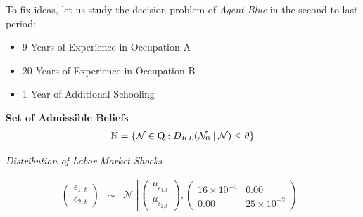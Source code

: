 \begin{frame}
To fix ideas, let us study the decision problem of \textit{Agent Blue} in the second to last period:

\begin{itemize}\setlength\itemsep{1em}
\item 9 Years of Experience in Occupation A
\item 20 Years of  Experience in Occupation B
\item 1 Year of Additional Schooling
\end{itemize}
\end{frame}
\begin{frame}
\textbf{Set of Admissible Beliefs}\medskip
\begin{align*}
\mathbb{N} = \{\mathcal{N} \in \mathrm{Q}: D_{KL}(\mathcal{N}_0\mid \mathcal{N}) \leq \theta\}
\end{align*}


\textit{Distribution of Labor Market Shocks}

\scriptsize\begin{eqnarray*}
\begin{pmatrix}
\epsilon_{1,t}\\
\epsilon_{2,t}
\end{pmatrix} & \sim & \mathcal{N}\left[\left(\begin{array}{c}
\mu_{\epsilon_{1, t}}\\
\mu_{\epsilon_{2, t}}
\end{array}\right),\left(\begin{array}{cccc}
16\times10^{-4}  &   0.00   \\
0.00            &   25\times10^{-2}
\end{array}\right)\right]
\end{eqnarray*}



\end{frame}
